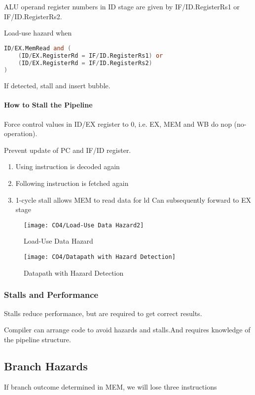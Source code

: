 ALU operand register numbers in ID stage are given by IF/ID.RegisterRs1 or IF/ID.RegisterRs2. 

Load-use hazard when 
\begin{lstlisting}[language=verilog,morekeywords={set_property,get_ports}, basicstyle=\small]
ID/EX.MemRead and (
    (ID/EX.RegisterRd = IF/ID.RegisterRs1) or 
    (ID/EX.RegisterRd = IF/ID.RegisterRs2)
)
\end{lstlisting}

If detected, stall and insert bubble. 

\paragraph{How to Stall the Pipeline}
Force control values in ID/EX register to 0, i.e. EX, MEM and WB do nop (no-operation). 

Prevent update of PC and IF/ID register. 
\begin{enumerate}\small
    \item Using instruction is decoded again
    \item Following instruction is fetched again
    \item 1-cycle stall allows MEM to read data for ld
    \subitem Can subsequently forward to EX stage
\end{enumerate}

\begin{figure}[!htb]
    \centering
    \texttt{[image: CO4/Load-Use Data Hazard2]}
    \caption{Load-Use Data Hazard}
\end{figure}

\begin{figure}[!htb]
    \centering
    \texttt{[image: CO4/Datapath with Hazard Detection]}
    \caption{Datapath with Hazard Detection}
\end{figure}


\subsubsection{Stalls and Performance}
Stalls reduce performance, but are required to get correct results. 

Compiler can arrange code to avoid hazards
and stalls.And requires knowledge of the pipeline structure. 

\subsection{Branch Hazards}
If branch outcome determined in MEM, we will lose three instructions

